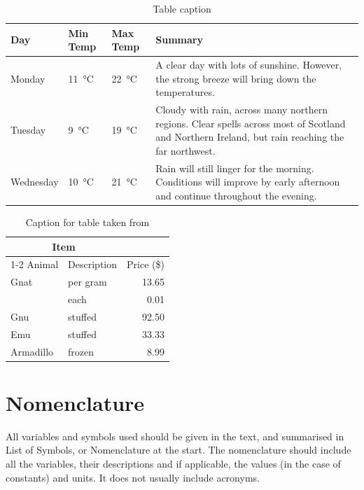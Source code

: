 \documentclass[a4paper,oneside,12pt]{book}
\begin{document}
\begin{table}[htb]
    \centering
    \begin{tabular}{l l l p{5cm}}
    \toprule
    Day & Min Temp & Max Temp & Summary \\ \midrule
    Monday & \SI{11}{\celsius} & \SI{22}{\celsius} & A clear day with lots of sunshine.  
    However, the strong breeze will bring down the temperatures. \\ \midrule
    Tuesday & \SI{9}{\celsius} & \SI{19}{\celsius}  & Cloudy with rain, across many northern regions. Clear spells 
    across most of Scotland and Northern Ireland, 
    but rain reaching the far northwest. \\ \midrule
    Wednesday & \SI{10}{\celsius}  & \SI{21}{\celsius}  & Rain will still linger for the morning. 
    Conditions will improve by early afternoon and continue 
    throughout the evening. \\
    \bottomrule
    \end{tabular}
    \caption{Table caption \citep{website:table}}
    \label{tab:my_label}
\end{table}

\begin{table}[htb]
    \centering
\begin{tabular}{llr}  
\toprule
\multicolumn{2}{c}{Item} \\
\cmidrule(r){1-2}
Animal    & Description & Price (\$) \\
\midrule
Gnat      & per gram    & 13.65      \\
          &    each     & 0.01       \\
Gnu       & stuffed     & 92.50      \\
Emu       & stuffed     & 33.33      \\
Armadillo & frozen      & 8.99       \\
\bottomrule
\end{tabular}
    \caption{Caption for table taken from \cite{website:table}}
    \label{tab:my_label2}
\end{table}

\section{Nomenclature}
All variables and symbols used should be given in the text, and summarised in List of Symbols, or Nomenclature at the start. 
The nomenclature should include all the variables, their descriptions and if applicable, the values (in the case of constants) and units. It does not usually include acronyms. 
\end{document}
